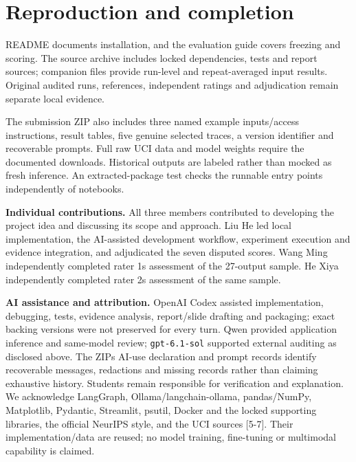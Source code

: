 \section{Reproduction and completion}\label{reproduction-and-completion}

README documents installation, and the evaluation guide covers freezing and scoring. The source archive includes locked dependencies, tests and report sources; companion files provide run-level and repeat-averaged input results. Original audited runs, references, independent ratings and adjudication remain separate local evidence.

The submission ZIP also includes three named example inputs/access instructions, result tables, five genuine selected traces, a version identifier and recoverable prompts. Full raw UCI data and model weights require the documented downloads. Historical outputs are labeled rather than mocked as fresh inference. An extracted-package test checks the runnable entry points independently of notebooks.

\textbf{Individual contributions.} All three members contributed to developing the project idea and discussing its scope and approach. Liu He led local implementation, the AI-assisted development workflow, experiment execution and evidence integration, and adjudicated the seven disputed scores. Wang Ming independently completed rater 1\textquotesingle s assessment of the 27-output sample. He Xiya independently completed rater 2\textquotesingle s assessment of the same sample.

\textbf{AI assistance and attribution.} OpenAI Codex assisted implementation, debugging, tests, evidence analysis, report/slide drafting and packaging; exact backing versions were not preserved for every turn. Qwen provided application inference and same-model review; \texttt{gpt-6.1-sol} supported external auditing as disclosed above. The ZIP\textquotesingle s AI-use declaration and prompt records identify recoverable messages, redactions and missing records rather than claiming exhaustive history. Students remain responsible for verification and explanation. We acknowledge LangGraph, Ollama/langchain-ollama, pandas/NumPy, Matplotlib, Pydantic, Streamlit, psutil, Docker and the locked supporting libraries, the official NeurIPS style, and the UCI sources {[}5-7{]}. Their implementation/data are reused; no model training, fine-tuning or multimodal capability is claimed.
